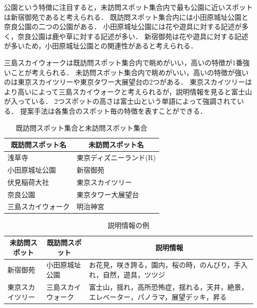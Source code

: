 \documentclass{deimj}
\begin{document}
公園という特徴に注目すると，未訪問スポット集合内で最も公園に近いスポットは新宿御苑であると考えられる．
既訪問スポット集合内には小田原城址公園と奈良公園の二つの公園がある．
小田原城址公園には花や遊具に対する記述が多く，奈良公園は鹿や草に対する記述が多い．
新宿御苑は花や遊具に対する記述が多いため，小田原城址公園との関連性があると考えられる．


三島スカイウォークは既訪問スポット集合内で眺めがいい，高いの特徴が1番強いことが考えられる．
未訪問スポット集合内で眺めがいい，高いの特徴が強いのは東京スカイツリーや東京タワー大展望台の2つがある．
東京スカイツリーはより高いによって三島スカイウォークと考えられるが，説明情報を見ると富士山が入っている．
2つスポットの高さは富士山という単語によって強調されている．
提案手法は各集合のスポット毎の特徴を表すことができる．

\begin{table}[t]
  \caption{既訪問スポット集合と未訪問スポット集合}
  \label{table:既訪問スポット集合と未訪問スポット集合}
  \centering
  \begin{tabular}{l|l}
  \hline
  \multicolumn{1}{c|}{既訪問スポット名} & \multicolumn{1}{c}{未訪問スポット名} \\ \hline
  浅草寺                           & 東京ディズニーランド(R)                \\
  小田原城址公園                       & 新宿御苑                         \\
  伏見稲荷大社                        & 東京スカイツリー                     \\
  奈良公園                          & 東京タワー大展望台                    \\
  三島スカイウォーク                     & 明治神宮                         \\ \hline
  \end{tabular}
\end{table}


\begin{table}[t]
  \caption{説明情報の例}
  \label{table:説明情報の例}
  \centering
  \begin{tabular}{l|l|l}
  \hline
  \multicolumn{1}{c|}{未訪問スポット} & \multicolumn{1}{c|}{既訪問スポット} & \multicolumn{1}{c}{説明情報}                     \\ \hline
  新宿御苑                      & 小田原城址公園                         & お花見，咲き誇る，園内，桜の時，のんびり，手入れ，自然，遊具，ツツジ          \\
  東京スカイツリー                     & 三島スカイウォーク                    & 富士山，揺れ，高所恐怖症，揺れる，天井，絶景，エレベーター，パノラマ，展望デッキ，昇る \\ \hline
  \end{tabular}
\end{table}
\end{document}
